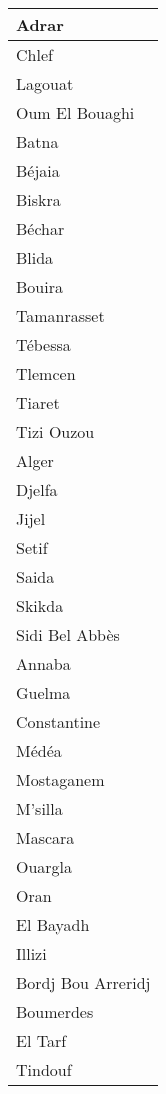 \begin{table}[!ht]
    \centering
    \begin{tabular}{|l|}
    \hline
        Adrar \\ \hline
        Chlef \\ \hline
        Lagouat \\ \hline
        Oum El Bouaghi \\ \hline
        Batna \\ \hline
        Béjaia \\ \hline
        Biskra \\ \hline
        Béchar \\ \hline
        Blida \\ \hline
        Bouira \\ \hline
        Tamanrasset \\ \hline
        Tébessa \\ \hline
        Tlemcen \\ \hline
        Tiaret \\ \hline
        Tizi Ouzou \\ \hline
        Alger \\ \hline
        Djelfa \\ \hline
        Jijel \\ \hline
        Setif \\ \hline
        Saida \\ \hline
        Skikda \\ \hline
        Sidi Bel Abbès \\ \hline
        Annaba \\ \hline
        Guelma \\ \hline
        Constantine \\ \hline
        Médéa \\ \hline
        Mostaganem \\ \hline
        M'silla \\ \hline
        Mascara \\ \hline
        Ouargla \\ \hline
        Oran \\ \hline
        El Bayadh \\ \hline
        Illizi \\ \hline
        Bordj Bou Arreridj \\ \hline
        Boumerdes \\ \hline
        El Tarf \\ \hline
        Tindouf \\ \hline

\end{tabular}
\end{table}
